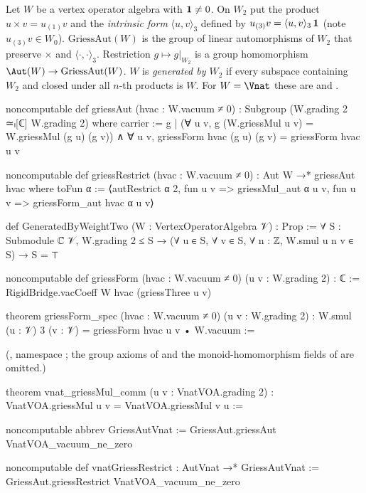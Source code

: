\begin{definition}\label{ch20:def:griessaut}
Let $W$ be a vertex operator algebra with $\mathbf 1\neq0$.  On $W_2$ put the product $u\times v=u_{(1)}v$ and the
\emph{intrinsic form} $\langle u,v\rangle_3$ defined by $u_{(3)}v=\langle u,v\rangle_3\,\mathbf 1$ (note
$u_{(3)}v\in W_0$).  $\mathrm{GriessAut}(W)$ is the group of linear automorphisms of $W_2$ that preserve $\times$ and
$\langle\cdot,\cdot\rangle_3$.  Restriction $g\mapsto g|_{W_2}$ is a group homomorphism
$\Aut(W)\to\mathrm{GriessAut}(W)$.  $W$ is \emph{generated by $W_2$} if every subspace containing $W_2$ and closed
under all $n$-th products is $W$.  For $W=\Vnat$ these are  and .
\end{definition}
\begin{leancode}
noncomputable def griessAut (hvac : W.vacuum ≠ 0) : Subgroup (W.grading 2 ≃ₗ[ℂ] W.grading 2) where
  carrier := {g | (∀ u v, g (W.griessMul u v) = W.griessMul (g u) (g v)) ∧
    ∀ u v, griessForm hvac (g u) (g v) = griessForm hvac u v}

noncomputable def griessRestrict (hvac : W.vacuum ≠ 0) : Aut W →* griessAut hvac where
  toFun α := ⟨autRestrict α 2, fun u v => griessMul_aut α u v, fun u v => griessForm_aut hvac α u v⟩

def GeneratedByWeightTwo (W : VertexOperatorAlgebra 𝒱) : Prop :=
  ∀ S : Submodule ℂ 𝒱, W.grading 2 ≤ S → (∀ u ∈ S, ∀ v ∈ S, ∀ n : ℤ, W.smul u n v ∈ S) → S = ⊤

noncomputable def griessForm (hvac : W.vacuum ≠ 0) (u v : W.grading 2) : ℂ :=
  RigidBridge.vacCoeff W hvac (griessThree u v)

theorem griessForm_spec (hvac : W.vacuum ≠ 0) (u v : W.grading 2) :
    W.smul (u : 𝒱) 3 (v : 𝒱) = griessForm hvac u v • W.vacuum :=
\end{leancode}
(, namespace ; the group axioms of 
and the monoid-homomorphism fields of  are omitted.)
\begin{leancode}
theorem vnat_griessMul_comm (u v : VnatVOA.grading 2) :
    VnatVOA.griessMul u v = VnatVOA.griessMul v u :=

noncomputable abbrev GriessAutVnat := GriessAut.griessAut VnatVOA_vacuum_ne_zero

noncomputable def vnatGriessRestrict : AutVnat →* GriessAutVnat :=
  GriessAut.griessRestrict VnatVOA_vacuum_ne_zero
\end{leancode}
